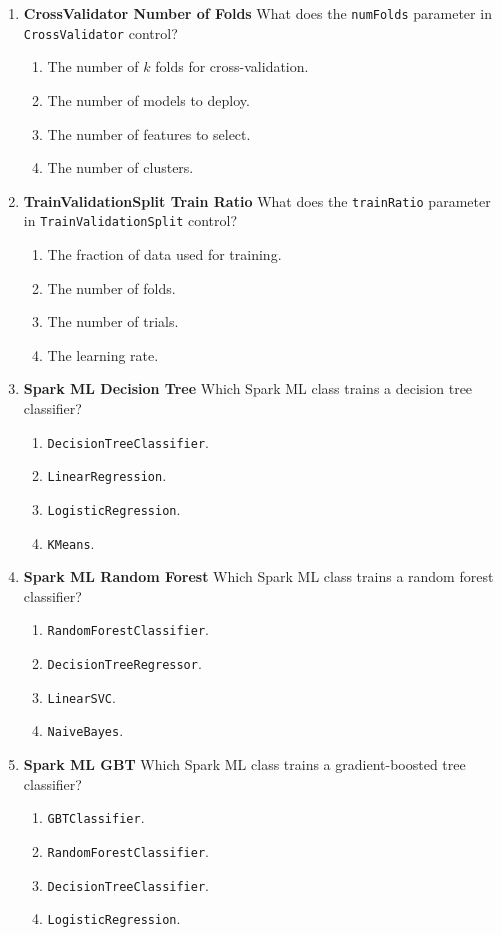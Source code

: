 \documentclass{article}
\begin{document}
\begin{enumerate}[label=\textbf{Q\arabic*.}]
		\item \textbf{CrossValidator Number of Folds}
		What does the \texttt{numFolds} parameter in \texttt{CrossValidator} control?
		\begin{enumerate}[label=\Alph*.]
			\item The number of $k$ folds for cross-validation.
			\item The number of models to deploy.
			\item The number of features to select.
			\item The number of clusters.
		\end{enumerate}
		
		\item \textbf{TrainValidationSplit Train Ratio}
		What does the \texttt{trainRatio} parameter in \texttt{TrainValidationSplit} control?
		\begin{enumerate}[label=\Alph*.]
			\item The fraction of data used for training.
			\item The number of folds.
			\item The number of trials.
			\item The learning rate.
		\end{enumerate}
		
		\item \textbf{Spark ML Decision Tree}
		Which Spark ML class trains a decision tree classifier?
		\begin{enumerate}[label=\Alph*.]
			\item \texttt{DecisionTreeClassifier}.
			\item \texttt{LinearRegression}.
			\item \texttt{LogisticRegression}.
			\item \texttt{KMeans}.
		\end{enumerate}
		
		\item \textbf{Spark ML Random Forest}
		Which Spark ML class trains a random forest classifier?
		\begin{enumerate}[label=\Alph*.]
			\item \texttt{RandomForestClassifier}.
			\item \texttt{DecisionTreeRegressor}.
			\item \texttt{LinearSVC}.
			\item \texttt{NaiveBayes}.
		\end{enumerate}
		
		\item \textbf{Spark ML GBT}
		Which Spark ML class trains a gradient-boosted tree classifier?
		\begin{enumerate}[label=\Alph*.]
			\item \texttt{GBTClassifier}.
			\item \texttt{RandomForestClassifier}.
			\item \texttt{DecisionTreeClassifier}.
			\item \texttt{LogisticRegression}.
		\end{enumerate}
		

\end{enumerate}
\end{document}
